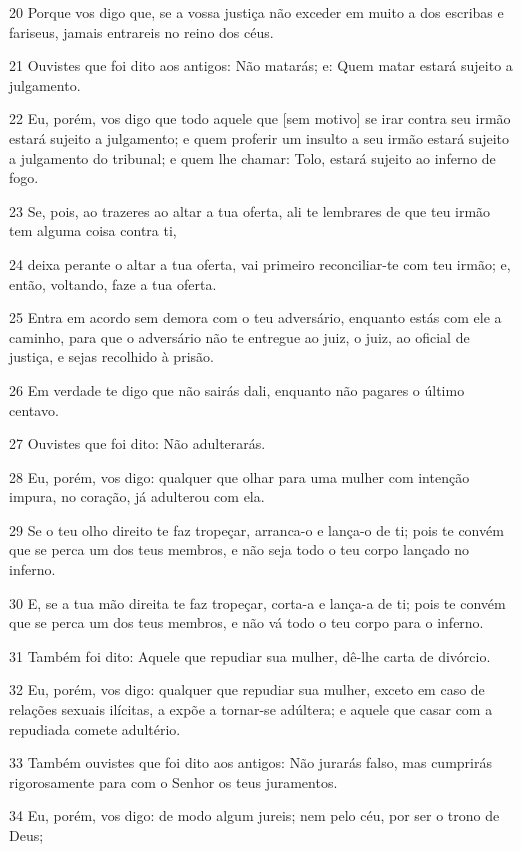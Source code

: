 \par 20 Porque vos digo que, se a vossa justiça não exceder em muito a dos escribas e fariseus, jamais entrareis no reino dos céus.
\par 21 Ouvistes que foi dito aos antigos: Não matarás; e: Quem matar estará sujeito a julgamento.
\par 22 Eu, porém, vos digo que todo aquele que [sem motivo] se irar contra seu irmão estará sujeito a julgamento; e quem proferir um insulto a seu irmão estará sujeito a julgamento do tribunal; e quem lhe chamar: Tolo, estará sujeito ao inferno de fogo.
\par 23 Se, pois, ao trazeres ao altar a tua oferta, ali te lembrares de que teu irmão tem alguma coisa contra ti,
\par 24 deixa perante o altar a tua oferta, vai primeiro reconciliar-te com teu irmão; e, então, voltando, faze a tua oferta.
\par 25 Entra em acordo sem demora com o teu adversário, enquanto estás com ele a caminho, para que o adversário não te entregue ao juiz, o juiz, ao oficial de justiça, e sejas recolhido à prisão.
\par 26 Em verdade te digo que não sairás dali, enquanto não pagares o último centavo.
\par 27 Ouvistes que foi dito: Não adulterarás.
\par 28 Eu, porém, vos digo: qualquer que olhar para uma mulher com intenção impura, no coração, já adulterou com ela.
\par 29 Se o teu olho direito te faz tropeçar, arranca-o e lança-o de ti; pois te convém que se perca um dos teus membros, e não seja todo o teu corpo lançado no inferno.
\par 30 E, se a tua mão direita te faz tropeçar, corta-a e lança-a de ti; pois te convém que se perca um dos teus membros, e não vá todo o teu corpo para o inferno.
\par 31 Também foi dito: Aquele que repudiar sua mulher, dê-lhe carta de divórcio.
\par 32 Eu, porém, vos digo: qualquer que repudiar sua mulher, exceto em caso de relações sexuais ilícitas, a expõe a tornar-se adúltera; e aquele que casar com a repudiada comete adultério.
\par 33 Também ouvistes que foi dito aos antigos: Não jurarás falso, mas cumprirás rigorosamente para com o Senhor os teus juramentos.
\par 34 Eu, porém, vos digo: de modo algum jureis; nem pelo céu, por ser o trono de Deus;
